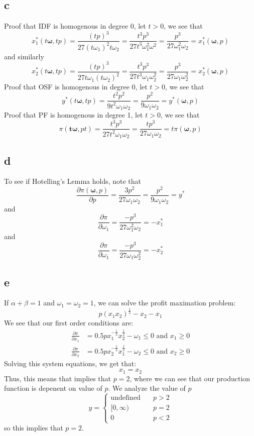 \documentclass[11pt]{article}
\begin{document}
\subsection*{c}
Proof that IDF is homogenous in degree 0, let $t >0$, we see that 
\[
x_1^*(t\mathbf{\omega}, tp) =\frac{(tp)^3}{27(t\omega_1)^2t\omega_2} = \frac{t^3 p^3}{27t^3\omega_1^2\omega^2} = \frac{p^3}{27\omega_1^2\omega_2} = x_1^*(\mathbf{\omega}, p)
\]
and similarly
\[
x_2^*(t\mathbf{\omega}, tp) = \frac{(tp)^3}{27t\omega_1(t\omega_2)^2} = \frac{t^3p^3}{27t^3\omega_1\omega_2^2} = \frac{p^3}{27\omega_1\omega_2^2} = x_2^*(\mathbf{\omega}, p)
\]
Proof that OSF is homogenous in degree 0, let $t > 0$, we see that 
\[
y^*(t\mathbf{\omega}, tp) = \frac{t^2p^2}{9t^2\omega_1\omega_2} = \frac{p^2}{9\omega_1\omega_2} = y^*(\mathbf{\omega}, p)
\]
Proof that PF is homogenous in degree 1, let $t > 0$, we see that 
\[
\pi(\mathbf{t\omega}, pt) = \frac{t^3p^3}{27t^2\omega_1\omega_2} = \frac{tp^3}{27\omega_1\omega_2} = t\pi(\mathbf{\omega}, p)
\]
\subsection*{d}
To see if Hotelling's Lemma holds, note that 
\[
\frac{\partial \pi(\mathbf{\omega}, p)}{\partial p} = \frac{3p^2}{27\omega_1\omega_2} = \frac{p^2}{9\omega_1\omega_2} = y^*
\]
and 
\[
\frac{\partial \pi}{\partial \omega_1} = \frac{-p^3}{27\omega_1^2\omega_2} = -x^*_1
\]
and 
\[
    \frac{\partial \pi}{\partial \omega_1} = \frac{-p^3}{27 \omega_1\omega_2^2} = -x^*_2
\]
\subsection*{e}

If $\alpha + \beta = 1$ and $\omega_1 = \omega_2 = 1$, we can solve the profit maximation problem:
\[
p(x_1x_2)^\frac{1}{2} - x_2 - x_1
\]
We see that our first order conditions are:
\begin{align*}
    \frac{\partial \pi}{\partial x_1} &= 0.5p x^{-\frac{1}{2}}_1 x_2^\frac{1}{2} - \omega_1 \leq 0 \text{ and } x_1 \geq 0 \\
    \frac{\partial \pi}{\partial x_2} &= 0.5 p x_2^{-\frac{1}{2}} x_1^\frac{1}{2} - \omega_2 \leq 0 \text{ and } x_2 \geq 0
\end{align*}
Solving this system equations, we get that:
\[
x_1 = x_2
\]
Thus, this means that implies that $p = 2$, where we can see that our production function is depenent on value of $p$. We analyze the value of $p$ 
\[
y = \begin{cases}
    \text{undefined} & \quad p > 2\\
    [0, \infty) & \quad p = 2\\
    0 & \quad p < 2 
\end{cases}
\]
so this implies that $p = 2$. 
\end{document}
